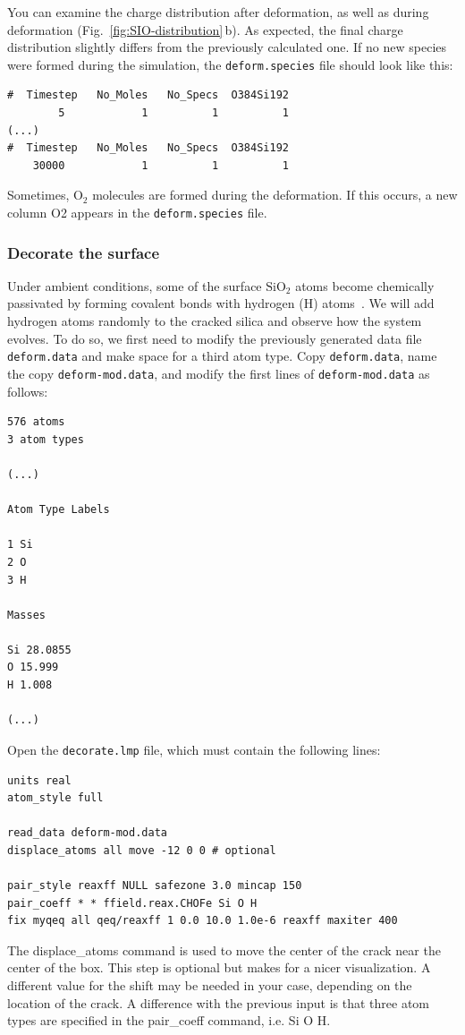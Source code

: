 \documentclass[9pt,tutorial]{livecoms}
\newcommand{\lmpcmd}[1]{\hspace{0pt}\colorbox{listing}{\textcolor{command}{\small{#1}}}\hspace{0pt}} %
\newcommand{\flecmd}[1]{\textcolor{command}{\texttt{#1}}} %
\begin{document}
You can examine the charge distribution after deformation, as well as during
deformation (Fig.~\ref{fig:SIO-distribution}\,b).  As expected, the final
charge distribution slightly differs from the previously calculated one.  If
no new species were formed during the simulation, the \flecmd{deform.species} file
should look like this:
\begin{lstlisting}
#  Timestep   No_Moles   No_Specs  O384Si192
        5            1          1          1
(...)
#  Timestep   No_Moles   No_Specs  O384Si192
    30000            1          1          1
\end{lstlisting}
Sometimes, $\text{O}_2$ molecules are formed during the deformation.  If this occurs,
a new column \lmpcmd{O2} appears in the \flecmd{deform.species} file.

\subsubsection{Decorate the surface}

Under ambient conditions, some of the surface $\text{SiO}_2$ atoms become chemically
passivated by forming covalent bonds with hydrogen (H) atoms~\cite{sulpizi2012silica}.
We will add hydrogen atoms randomly to the cracked silica and observe how the
system evolves.  To do so, we first need to modify the previously generated data
file \flecmd{deform.data} and make space for a third atom type.
Copy \flecmd{deform.data}, name the copy \flecmd{deform-mod.data}, and modify the
first lines of \flecmd{deform-mod.data} as follows:
\begin{lstlisting}
576 atoms
3 atom types

(...)

Atom Type Labels

1 Si
2 O
3 H

Masses

Si 28.0855
O 15.999
H 1.008

(...)
\end{lstlisting}

Open the \flecmd{decorate.lmp} file, which must contain the following lines:
\begin{lstlisting}
units real
atom_style full

read_data deform-mod.data
displace_atoms all move -12 0 0 # optional

pair_style reaxff NULL safezone 3.0 mincap 150
pair_coeff * * ffield.reax.CHOFe Si O H
fix myqeq all qeq/reaxff 1 0.0 10.0 1.0e-6 reaxff maxiter 400
\end{lstlisting}
The \lmpcmd{displace\_atoms} command is used to move the center of the
crack near the center of the box.  This step is optional but makes for a nicer
visualization.  A different value for the shift may be needed in
your case, depending on the location of the crack.  A difference with the previous
input is that three atom types are specified in the \lmpcmd{pair\_coeff} command, i.e.
\lmpcmd{Si O H}.
\end{document}
